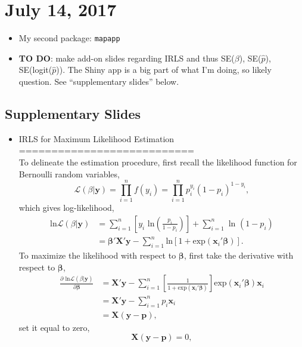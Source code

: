 \documentclass{article}
\begin{document}
\section*{July 14, 2017}
\begin{itemize}
\item My second package: \verb|mapapp|
\item {\bf TO DO}: make add-on slides regarding IRLS and thus SE($\beta$), SE($\hat{p}$), SE(logit($\hat{p}$)). The Shiny app is a big part of what I'm doing, so likely question. See ``supplementary slides'' below.
\end{itemize}

\subsection*{Supplementary Slides}
\begin{itemize}
\item IRLS for Maximum Likelihood Estimation =========================== \\
To delineate the estimation procedure, first recall the likelihood function for Bernoulli random variables,
\begin{equation}
\mathcal{L}(\beta|\pmb{y}) = \prod_{i=1}^{n} f(y_{i}) =  \prod_{i=1}^{n} p_{i}^{y_{i}}(1-p_{i})^{1-y_{i}},
\end{equation}
which gives log-likelihood,
\begin{align}
\text{ln} \mathcal{L}(\beta|\pmb{y}) &= \sum_{i=1}^{n} \left[ y_{i} \text{ ln}\left(\frac{p_{i}}{1-p_{i}}\right) \right] + \sum_{i=1}^{n} \text{ ln }(1-p_{i}) \\
&= \pmb{\beta}'\pmb{X}'\pmb{y} - \sum_{i=1}^{n} \text{ln}[1 + \text{exp}(\pmb{x}_{i}'\pmb{\beta})].
\end{align}
To maximize the likelihood with respect to $\pmb{\beta}$, first take the derivative with respect to $\pmb{\beta}$,
\begin{align}
\frac{\partial \text{ ln} \mathcal{L}(\beta|\pmb{y})}{\partial \pmb{\beta}} &= \pmb{X}'\pmb{y} - \sum_{i=1}^{n}  \left[ \frac{1}{1 + \text{exp}(\pmb{x}_{i}'\pmb{\beta})} \right] \text{exp}  (\pmb{x}_{i}' \pmb{\beta}) \pmb{x}_{i} \\
&= \pmb{X}'\pmb{y} - \sum_{i=1}^{n} p_{i} \pmb{x}_{i} \\
&= \pmb{X}(\pmb{y} - \pmb{p}),
\end{align}
set it equal to zero,
\begin{equation}
\pmb{X}(\pmb{y} - \pmb{p}) = 0,
\end{equation}

\end{itemize}
\end{document}
